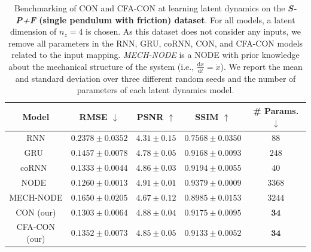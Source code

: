 \begin{table}[ht]
    \centering
    \begin{scriptsize}
    \begin{tabular}{c c c c c}
         \toprule
         \textbf{Model} & \textbf{RMSE} $\downarrow$ & \textbf{PSNR} $\uparrow$ & \textbf{SSIM} $\uparrow$ & \textbf{\# Params.} $\downarrow$ \\
         \midrule
         RNN & $0.2378 \pm 0.0352$ & $4.31 \pm 0.15$ & $0.7568 \pm 0.0350$ & $88$\\
         GRU~\citep{cho2014learning} & $0.1457 \pm 0.0078$ & $4.78 \pm 0.05$ & $0.9168 \pm 0.0093$ & $248$\\
         coRNN~\citep{rusch2020coupled} & $0.1333 \pm 0.0044$ & $4.86 \pm 0.03$ & $0.9194 \pm 0.0055$ & $40$\\
         NODE~\citep{chen2018neural} & $\mathbf{0.1260 \pm 0.0013}$ & $\mathbf{4.91 \pm 0.01}$ & $\mathbf{0.9379 \pm 0.0009}$ & $3368$\\
         MECH-NODE & $0.1650 \pm 0.0205$ & $4.67 \pm 0.12$ & $0.8985 \pm 0.0153$ & $3244$\\
         CON (our) & $0.1303 \pm 0.0064$ & $4.88 \pm 0.04$ & $0.9175 \pm 0.0095$ & $\mathbf{34}$\\
         CFA-CON (our) & $0.1352 \pm 0.0073$ & $4.85 \pm 0.05$ & $0.9133 \pm 0.0052$ & $\mathbf{34}$\\
         \bottomrule
    \end{tabular}
    \end{scriptsize}
    \vspace{0.5cm}
    \caption{Benchmarking of \gls{CON} and \gls{CFA-CON} at learning latent dynamics on the \textbf{\emph{S-P+F} (single pendulum with friction) dataset}. For all models, a latent dimension of $n_z=4$ is chosen. 
    As this dataset does not consider any inputs, we remove all parameters in the RNN, GRU, coRNN, CON, and CFA-CON models related to the input mapping.
    \emph{MECH-NODE} is a \gls{NODE} with prior knowledge about the mechanical structure of the system (i.e., $\frac{\mathrm{d}x}{\mathrm{d}t} = \dot{x}$). We report the mean and standard deviation over three different random seeds and the number of parameters of each latent dynamics model.
    }
    \label{tab:apx-con:latent_dynamics_results:s_p_f}
\end{table}

